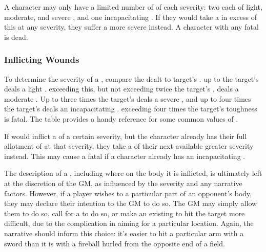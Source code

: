 A character may only have a limited number of {\wounds} of each severity: two each of light, moderate, and severe {\wounds}, and one incapacitating {\wound}.
If they would take a {\wound} in excess of this at any severity, they suffer a more severe {\wound} instead.
A character with any fatal {\wounds} is dead.

\subsubsection{Inflicting Wounds}

To determine the severity of a {\wound}, compare the {\damage} dealt to target's {\toughness}.
\capital{\damage} up to the target's {\toughness} deals a light {\wound}.
\capital{\damage} exceeding this, but not exceeding twice the target's {\toughness}, deals a moderate {\wound}.
Up to three times the target's {\toughness} deals a severe {\wound}, and up to four times the target's {\toughness} deals an incapacitating {\wound}.
\capital{\damage} exceeding four times the target's {\toughness} toughness is fatal.
The  table provides a handy reference for some common values of {\toughness}.


If {\damage} would inflict a {\wound} of a certain severity, but the character already has their full allotment of {\wounds} at that severity, they take a {\wound} of their next available greater severity instead.
This may cause a fatal {\wound} if a character already has an incapacitating {\wound}.

The description of a {\wound}, including where on the body it is inflicted, is ultimately left at the discretion of the GM, as influenced by the severity and any narrative factors.
However, if a player wishes to {\wound} a particular part of an opponent's body, they may declare their intention to the GM to do so.
The GM may simply allow them to do so, call for a {\test} to do so, or make an existing {\test} to hit the target more difficult, due to the complication in aiming for a particular location.
Again, the narrative should inform this choice: it's easier to hit a particular arm with a sword than it is with a fireball hurled from the opposite end of a field.


